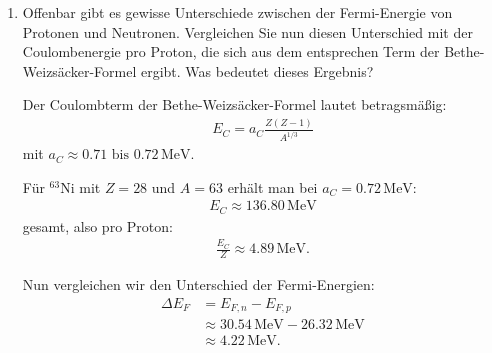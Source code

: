 \documentclass[11pt,a4paper]{scrartcl}
\begin{document}
\begin{enumerate}
\begin{calculationbox}
\begin{calculationbox}
                        $E_{F,p} = p_{F, p}^2 / (2m_N) \approx 26.32$ MeV
                    \end{calculationbox}

                    Neutron in 63 NI
                    \begin{calculationbox}
                        $n = _N = 35$

                        $p_{\text{F}, n} = \frac{\hbar}{R_0} (\frac{9\pi}{4} \frac{35}{63})^\frac{1}{3} \approx 239.48 $ MeV$/$c

                        $E_{F,n} = p_{F_n}^2/(2m_N) \approx 3ß.54$ MeV
                    \end{calculationbox}

                \end{calculationbox}

            \item
                Offenbar gibt es gewisse Unterschiede zwischen der Fermi-Energie von Protonen und Neutronen. Vergleichen Sie nun diesen Unterschied mit der Coulombenergie pro Proton, die sich aus dem entsprechen Term der Bethe-Weizsäcker-Formel ergibt. Was bedeutet dieses Ergebnis?

                \begin{calculationbox}
                    Der Coulombterm der Bethe-Weizsäcker-Formel lautet betragsmäßig:
                    \begin{align*}
                        E_C = a_C \frac{Z(Z-1)}{A^{1/3}}
                    \end{align*}
                    mit $a_C \approx 0.71 \text{ bis } 0.72\,\mathrm{MeV}$.

                    Für ${}^{63}\mathrm{Ni}$ mit $Z = 28$ und $A = 63$ erhält man bei $a_C = 0.72\,\mathrm{MeV}$:
                    \begin{align*}
                        E_C \approx 136.80\,\mathrm{MeV}
                    \end{align*}
                    gesamt, also pro Proton:
                    \begin{align*}
                        \frac{E_C}{Z} \approx 4.89\,\mathrm{MeV}.
                    \end{align*}

                    Nun vergleichen wir den Unterschied der Fermi-Energien:
                    \begin{align*}
                        \Delta E_F &= E_{F,n} - E_{F,p} \\
                                &\approx 30.54\,\mathrm{MeV} - 26.32\,\mathrm{MeV} \\
                                &\approx 4.22\,\mathrm{MeV}.
                    \end{align*}


\end{calculationbox}
\end{enumerate}
\end{document}
